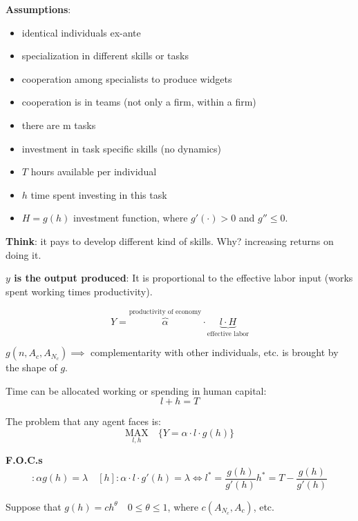 \documentclass[14pt,notitlepage]{article}
\begin{document}
\textbf{Assumptions}:

\begin{itemize}
\item identical individuals ex-ante
\item specialization in different skills or tasks
\item cooperation among specialists to produce widgets
\item cooperation is in teams (not only a firm, within a firm)
\item there are m tasks
\item investment in task specific skills (no dynamics)
\item $T$ hours available per individual
\item $h$ time spent investing in this task
\item $H = g(h)$ investment function, where $g'(\cdot)>0$ and $g'' \leq 0$.
\end{itemize}

\textbf{Think}: it pays to develop different kind of skills. Why? increasing returns on doing it.

\textbf{$y$ is the output produced}: It is proportional to the effective labor input (works spent working times productivity).

\begin{equation*}
Y = \overbrace{\alpha}^{\text{productivity of economy}} \cdot \underbrace{l \cdot H}_{\text{effective labor}}
\end{equation*}

$g(n,A_c,A_{N_c}) \implies$ complementarity with other individuals, etc. is brought by the shape of $g$.

Time can be allocated working or spending in human capital:
\begin{equation*}
\boxed{l + h = T}
\end{equation*}

The problem that any agent faces is:
\begin{equation*}
\underset{l,h}{\text{MAX}} \quad \{Y = \alpha \cdot l \cdot g(h)\}
\end{equation*}

\textbf{F.O.C.s}
\begin{equation*}
[l]: \alpha g(h) = \lambda \quad [h]: \alpha \cdot l \cdot g'(h) = \lambda \Leftrightarrow \boxed{l^* = \frac{g(h)}{g'(h)}} \boxed{h^* = T - \frac{g(h)}{g'(h)}}
\end{equation*}

Suppose that $g(h) = c h^{\theta} \quad  0 \leq \theta \leq 1$, where $c(A_{N_c},A_c)$, etc.
\end{document}
